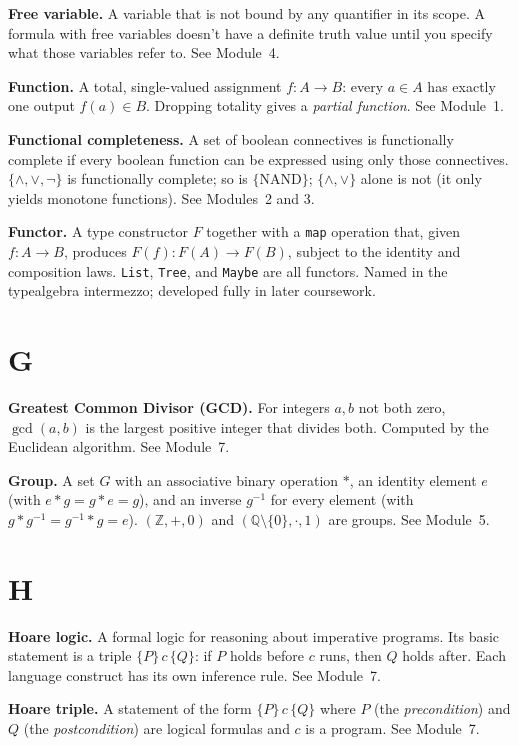 \documentclass[11pt]{article}
\begin{document}
\textbf{Free variable.} A variable that is not bound by any quantifier in its scope. A formula with free variables doesn't have a definite truth value until you specify what those variables refer to. See Module~4.

\textbf{Function.} A total, single-valued assignment $f : A \to B$: every $a \in A$ has exactly one output $f(a) \in B$. Dropping totality gives a \emph{partial function}. See Module~1.

\textbf{Functional completeness.} A set of boolean connectives is functionally complete if every boolean function can be expressed using only those connectives. $\{\wedge, \vee, \lnot\}$ is functionally complete; so is $\{\text{NAND}\}$; $\{\wedge, \vee\}$ alone is not (it only yields monotone functions). See Modules~2 and 3.

\textbf{Functor.} A type constructor $F$ together with a \texttt{map} operation that, given $f : A \to B$, produces $F(f) : F(A) \to F(B)$, subject to the identity and composition laws. \texttt{List}, \texttt{Tree}, and \texttt{Maybe} are all functors. Named in the typealgebra intermezzo; developed fully in later coursework.

\section*{G}

\textbf{Greatest Common Divisor (GCD).} For integers $a, b$ not both zero, $\gcd(a, b)$ is the largest positive integer that divides both. Computed by the Euclidean algorithm. See Module~7.

\textbf{Group.} A set $G$ with an associative binary operation $*$, an identity element $e$ (with $e * g = g * e = g$), and an inverse $g^{-1}$ for every element (with $g * g^{-1} = g^{-1} * g = e$). $(\mathbb{Z}, +, 0)$ and $(\mathbb{Q} \setminus \{0\}, \cdot, 1)$ are groups. See Module~5.

\section*{H}

\textbf{Hoare logic.} A formal logic for reasoning about imperative programs. Its basic statement is a triple $\{P\}\, c\, \{Q\}$: if $P$ holds before $c$ runs, then $Q$ holds after. Each language construct has its own inference rule. See Module~7.

\textbf{Hoare triple.} A statement of the form $\{P\}\, c\, \{Q\}$ where $P$ (the \emph{precondition}) and $Q$ (the \emph{postcondition}) are logical formulas and $c$ is a program. See Module~7.
\end{document}
